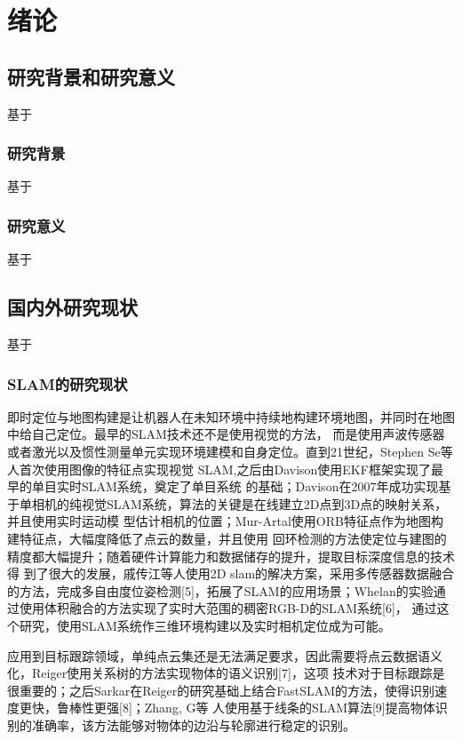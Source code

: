 \chapter{绪论}
\label{cha:chap1}
\section{研究背景和研究意义}
\label{sec:1.1}
基于
\subsection{研究背景}
\label{sec:1.1.1}
基于
\subsection{研究意义}
\label{sec:1.1.2}
基于
\section{国内外研究现状}
\label{sec:1.2}
基于
\subsection{SLAM的研究现状}
\label{sec:1.2.1}
即时定位与地图构建是让机器人在未知环境中持续地构建环境地图，并同时在地图中给自己定位。最早的SLAM技术还不是使用视觉的方法，
而是使用声波传感器或者激光以及惯性测量单元实现环境建模和自身定位。直到21世纪，Stephen Se等人首次使用图像的特征点实现视觉
SLAM\cite{se2002mobile},之后由Davison使用EKF框架实现了最早的单目实时SLAM系统\cite{davison2003real}，奠定了单目系统
的基础；Davison在2007年成功实现基于单相机的纯视觉SLAM系统，算法的关键是在线建立2D点到3D点的映射关系，并且使用实时运动模
型估计相机的位置\cite{davison2007monoslam}；Mur-Artal使用ORB特征点作为地图构建特征点，大幅度降低了点云的数量，并且使用
回环检测的方法使定位与建图的精度都大幅提升\cite{mur2015orb}；随着硬件计算能力和数据储存的提升，提取目标深度信息的技术得
到了很大的发展，戚传江等人使用2D slam的解决方案，采用多传感器数据融合的方法，完成多自由度位姿检测[5]，拓展了SLAM的应用场景；Whelan的实验通过使用体积融合的方法实现了实时大范围的稠密RGB-D的SLAM系统[6]，
通过这个研究，使用SLAM系统作三维环境构建以及实时相机定位成为可能。

应用到目标跟踪领域，单纯点云集还是无法满足要求，因此需要将点云数据语义化，Reiger使用关系树的方法实现物体的语义识别[7]，这项
技术对于目标跟踪是很重要的；之后Sarkar在Reiger的研究基础上结合FastSLAM的方法，使得识别速度更快，鲁棒性更强[8]；Zhang, G等
人使用基于线条的SLAM算法[9]提高物体识别的准确率，该方法能够对物体的边沿与轮廓进行稳定的识别。

